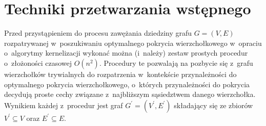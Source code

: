 \section{Techniki przetwarzania wstępnego}\label{Section_preprocessing}

Przed przystąpieniem do procesu zawężania dziedziny grafu $G=(V,E)$
rozpatrywanej w~poszukiwaniu optymalnego pokrycia wierzchołkowego w~opraciu o~algorytmy kernelizacji wykonać można 
(i~należy) zestaw prostych procedur o~złożoności czasowej $O(n^2)$.
Procedury te pozwalają na pozbycie się z~grafu wierzchołków trywialnych do 
rozpatrzenia w~kontekście przynależności do optymalnego pokrycia wierzchołkowego,
o~których przynależności do pokrycia decydują proste cechy związane
z~najbliższym sąsiedztwem danego wierzchołka.
Wynikiem każdej z~procedur jest graf $G^\prime=(V^\prime, E^\prime)$ składający się ze zbiorów $V^\prime\subseteq V$ oraz $E^\prime \subseteq E$.

